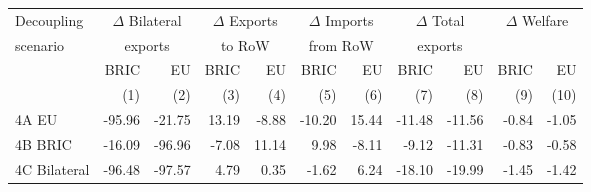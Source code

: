 \begin{tabular}{lrrrrrrrrrr}
  \hline
  Decoupling & \multicolumn{2}{c}{$\Delta$ Bilateral} & \multicolumn{2}{c}{$\Delta$ Exports} & \multicolumn{2}{c}{$\Delta$ Imports} & \multicolumn{2}{c}{$\Delta$ Total} & \multicolumn{2}{c}{$\Delta$ Welfare}\\
scenario & \multicolumn{2}{c}{exports} & \multicolumn{2}{c}{to RoW} & \multicolumn{2}{c}{from RoW} & \multicolumn{2}{c}{exports} & }\\\cmidrule{2-11}
& BRIC & EU & BRIC & EU & BRIC & EU & BRIC & EU & BRIC & EU} \\
& (1) & (2) & (3) & (4) & (5) & (6) & (7) & (8) & (9) & (10)} \\
 \hline
4A EU & -95.96 & -21.75 & 13.19 & -8.88 & -10.20 & 15.44 & -11.48 & -11.56 & -0.84 & -1.05 \\ 
  4B BRIC & -16.09 & -96.96 & -7.08 & 11.14 & 9.98 & -8.11 & -9.12 & -11.31 & -0.83 & -0.58 \\ 
  4C Bilateral & -96.48 & -97.57 & 4.79 & 0.35 & -1.62 & 6.24 & -18.10 & -19.99 & -1.45 & -1.42 \\ 
   \hline
\end{tabular}
